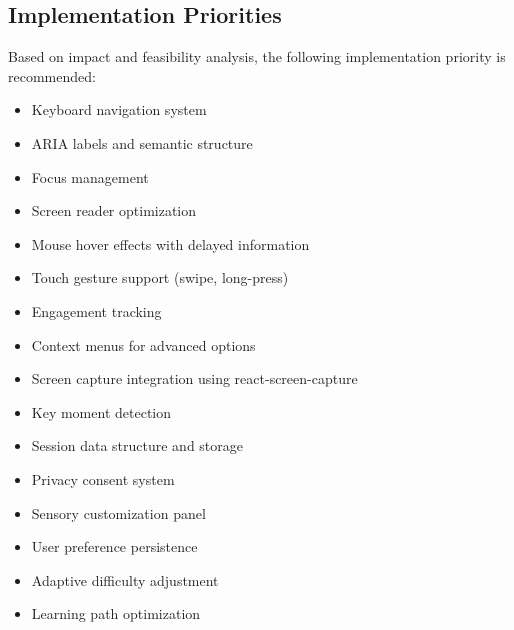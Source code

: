 \documentclass[12pt, a4paper]{article}
\begin{document}
\subsection{Implementation Priorities}

Based on impact and feasibility analysis, the following implementation priority is recommended:

\begin{tcolorbox}[colback=accentgreen!5, colframe=primaryblue, title=Phase 1: Core Accessibility (Weeks 1-2)]
\begin{itemize}[leftmargin=*]
    \item Keyboard navigation system
    \item ARIA labels and semantic structure
    \item Focus management
    \item Screen reader optimization
\end{itemize}
\end{tcolorbox}

\begin{tcolorbox}[colback=secondaryblue!5, colframe=accentgreen, title=Phase 2: Enhanced Interactions (Weeks 3-4)]
\begin{itemize}[leftmargin=*]
    \item Mouse hover effects with delayed information
    \item Touch gesture support (swipe, long-press)
    \item Engagement tracking
    \item Context menus for advanced options
\end{itemize}
\end{tcolorbox}

\begin{tcolorbox}[colback=warningorange!5, colframe=secondaryblue, title=Phase 3: Recording \& Analytics (Weeks 5-6)]
\begin{itemize}[leftmargin=*]
    \item Screen capture integration using react-screen-capture
    \item Key moment detection
    \item Session data structure and storage
    \item Privacy consent system
\end{itemize}
\end{tcolorbox}

\begin{tcolorbox}[colback=lightgray, colframe=primaryblue, title=Phase 4: Personalization (Weeks 7-8)]
\begin{itemize}[leftmargin=*]
    \item Sensory customization panel
    \item User preference persistence
    \item Adaptive difficulty adjustment
    \item Learning path optimization
\end{itemize}
\end{tcolorbox}
\end{document}
